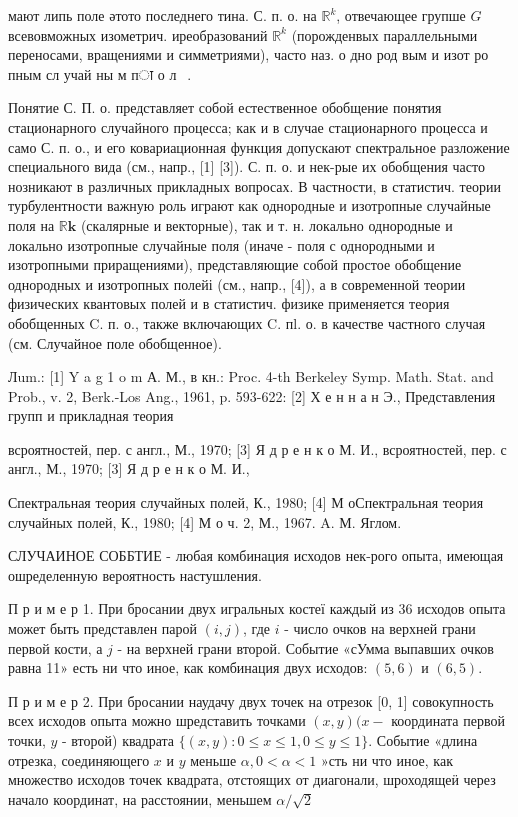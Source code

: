 \documentclass[10pt]{article}
\begin{document}
мают липь поле әтото последнего тина. С. п. о. на $\mathbb{R}^{k}$, отвечающее групше $G$ всевовможных изометрич. иреобразований $\mathbb{R}^{k}$ (порожденвых параллельными переносами, вращениями и симметриями), часто наз. о дно род вым и изот ро пным сл учай ны м пा о л $\mathbf{~} \mathbf{~}$.



Понятие С. П. о. представляет собой естественное обобщение понятия стационарного случайного процесса; как и в случае стационарного процесса и само С. п. о., и его ковариационная функция допускают спектральное разложение специального вида (см., напр., [1] [3]). С. п. о. и нек-рые их обобщения часто нозникают в различных прикладных вопросах. В частности, в статистич. теории турбулентности важную роль играют как однородные и изотропные случайные поля на $\mathbb{R} \boldsymbol{k}$ (скалярные и векторные), так и т. н. локально однородные и локально изотропные случайные поля (иначе - поля с однородными и изотропными приращениями), представляющие собой простое обобщение однородных и изотропных полейі (см., напр., [4]), а в современной теории физических квантовых полей и в статистич. физике применяется теория обобщенных C. п. о., также включающих C. пl. о. в качестве частного случая (см. Случайное поле обобщенное).



Лum.: [1] Y a g 1 o m А. М., в кн.: Proc. 4-th Berkeley Symp. Math. Stat. and Prob., v. 2, Berk.-Los Ang., 1961, p. 593-622: [2] Х е н н а н Э., Представления групп и прикладная теория

всроятностей, пер. с англ., М., 1970; [3] Я д р е н к о М. И., всроятностей, пер. с англ., М., 1970; [3] Я д р е н к о М. И.,

Спектральная теория случайных полей, К., 1980; [4] М оСпектральная теория случайных полей, К., 1980; [4] М о ч. 2, М., 1967. A. М. Яглом.



СЛУЧАИНОЕ СОББТИЕ - любая комбинация исходов нек-рого опыта, имеющая ошределенную вероятность настушления.



П р и м е р 1. При бросании двух игральных костеї каждый из 36 исходов опыта может быть представлен парой $(i, j)$, где $i$ - число очков на верхней грани первой кости, а $j$ - на верхней грани второй. Событие «сУмма выпавших очков равна 11» есть ни что иное, как комбинация двух исходов: $(5,6)$ и $(6,5)$.



П р и м е р 2. При бросании наудачу двух точек на отрезок [0, 1] совокупность всех исходов опыта можно шредставить точками $(x, y)(x-$ координата первой точки, $y$ - второй) квадрата $\{(x, y): 0 \leqslant x \leqslant 1,0 \leqslant y \leqslant 1\}$. Событие «длина отрезка, соединяющего $x$ и $y$ меньше $\alpha, 0<\alpha<1$ »сть ни что иное, как множество исходов точек квадрата, отстоящих от диагонали, шроходящеӥ через начало координат, на расстоянии, меньшем $\alpha / \sqrt{2}$
\end{document}

